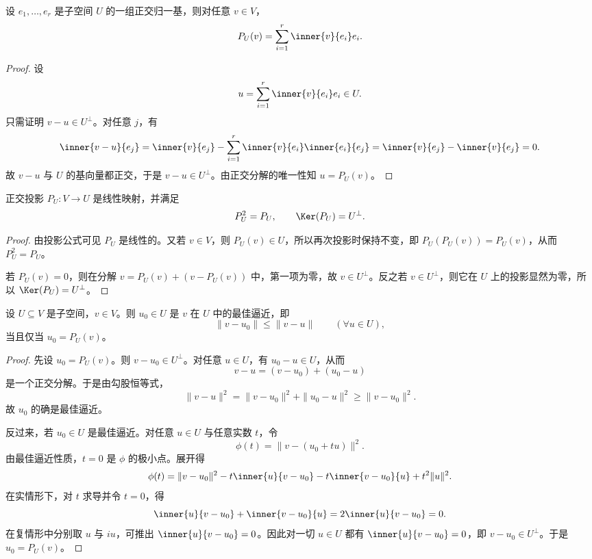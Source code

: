 \begin{theorem}[投影公式]
设 $e_1,\dots,e_r$ 是子空间 $U$ 的一组正交归一基，则对任意 $v\in V$，
\[
P_U(v)=\sum_{i=1}^r \inner{v}{e_i}e_i.
\]
\end{theorem}

\begin{proof}
设
\[
u=\sum_{i=1}^r \inner{v}{e_i}e_i\in U.
\]
只需证明 $v-u\in U^{\perp}$。对任意 $j$，有
\[
\inner{v-u}{e_j}=\inner{v}{e_j}-\sum_{i=1}^r \inner{v}{e_i}\inner{e_i}{e_j}=\inner{v}{e_j}-\inner{v}{e_j}=0.
\]
故 $v-u$ 与 $U$ 的基向量都正交，于是 $v-u\in U^{\perp}$。由正交分解的唯一性知 $u=P_U(v)$。
\end{proof}

\begin{proposition}
正交投影 $P_U:V\to U$ 是线性映射，并满足
\[
P_U^2=P_U,\qquad \Ker(P_U)=U^{\perp}.
\]
\end{proposition}

\begin{proof}
由投影公式可见 $P_U$ 是线性的。又若 $v\in V$，则 $P_U(v)\in U$，所以再次投影时保持不变，即 $P_U(P_U(v))=P_U(v)$，从而 $P_U^2=P_U$。

若 $P_U(v)=0$，则在分解 $v=P_U(v)+(v-P_U(v))$ 中，第一项为零，故 $v\in U^{\perp}$。反之若 $v\in U^{\perp}$，则它在 $U$ 上的投影显然为零，所以 $\Ker(P_U)=U^{\perp}$。
\end{proof}

\begin{theorem}[最佳逼近定理]
设 $U\subseteq V$ 是子空间，$v\in V$。则 $u_0\in U$ 是 $v$ 在 $U$ 中的最佳逼近，即
\[
\|v-u_0\|\le \|v-u\|\qquad (\forall u\in U),
\]
当且仅当 $u_0=P_U(v)$。
\end{theorem}

\begin{proof}
先设 $u_0=P_U(v)$。则 $v-u_0\in U^{\perp}$。对任意 $u\in U$，有 $u_0-u\in U$，从而
\[
v-u=(v-u_0)+(u_0-u)
\]
是一个正交分解。于是由勾股恒等式，
\[
\|v-u\|^2=\|v-u_0\|^2+\|u_0-u\|^2\ge \|v-u_0\|^2.
\]
故 $u_0$ 的确是最佳逼近。

反过来，若 $u_0\in U$ 是最佳逼近。对任意 $u\in U$ 与任意实数 $t$，令
\[
\phi(t)=\|v-(u_0+tu)\|^2.
\]
由最佳逼近性质，$t=0$ 是 $\phi$ 的极小点。展开得
\[
\phi(t)=\|v-u_0\|^2-t\inner{u}{v-u_0}-t\inner{v-u_0}{u}+t^2\|u\|^2.
\]
在实情形下，对 $t$ 求导并令 $t=0$，得
\[
\inner{u}{v-u_0}+\inner{v-u_0}{u}=2\inner{u}{v-u_0}=0.
\]
在复情形中分别取 $u$ 与 $iu$，可推出 $\inner{u}{v-u_0}=0$。因此对一切 $u\in U$ 都有 $\inner{u}{v-u_0}=0$，即 $v-u_0\in U^{\perp}$。于是 $u_0=P_U(v)$。
\end{proof}

